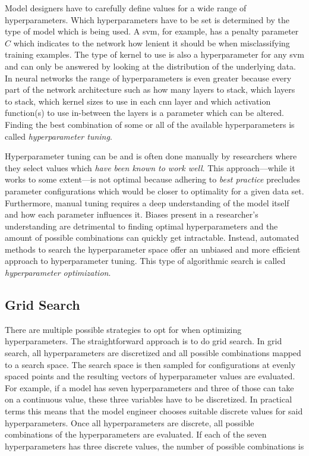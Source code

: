 \documentclass[final]{vutinfth} %
\begin{document}
Model designers have to carefully define values for a wide range of
hyperparameters. Which hyperparameters have to be set is determined by
the type of model which is being used. A \gls{svm}, for example, has a
penalty parameter $C$ which indicates to the network how lenient it
should be when misclassifying training examples. The type of kernel to
use is also a hyperparameter for any \gls{svm} and can only be
answered by looking at the distribution of the underlying data. In
neural networks the range of hyperparameters is even greater because
every part of the network architecture such as how many layers to
stack, which layers to stack, which kernel sizes to use in each
\gls{cnn} layer and which activation function(s) to use in-between the
layers is a parameter which can be altered. Finding the best
combination of some or all of the available hyperparameters is called
\emph{hyperparameter tuning}.

Hyperparameter tuning can be and is often done manually by researchers
where they select values which \emph{have been known to work
well}. This approach—while it works to some extent—is not optimal
because adhering to \emph{best practice} precludes parameter
configurations which would be closer to optimality for a given data
set. Furthermore, manual tuning requires a deep understanding of the
model itself and how each parameter influences it. Biases present in a
researcher's understanding are detrimental to finding optimal
hyperparameters and the amount of possible combinations can quickly
get intractable. Instead, automated methods to search the
hyperparameter space offer an unbiased and more efficient approach to
hyperparameter tuning. This type of algorithmic search is called
\emph{hyperparameter optimization}.

\subsection{Grid Search}
\label{ssec:grid-search}

There are multiple possible strategies to opt for when optimizing
hyperparameters. The straightforward approach is to do grid search. In
grid search, all hyperparameters are discretized and all possible
combinations mapped to a search space. The search space is then
sampled for configurations at evenly spaced points and the resulting
vectors of hyperparameter values are evaluated. For example, if a
model has seven hyperparameters and three of those can take on a
continuous value, these three variables have to be discretized. In
practical terms this means that the model engineer chooses suitable
discrete values for said hyperparameters. Once all hyperparameters are
discrete, all possible combinations of the hyperparameters are
evaluated. If each of the seven hyperparameters has three discrete
values, the number of possible combinations is
\end{document}

